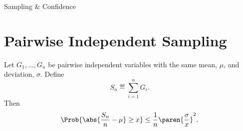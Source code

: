 \documentclass[handout]{mcs}
\begin{document}


\begin{staffnotes}
Sampling \& Confidence
\end{staffnotes}



\section*{Pairwise Independent Sampling}

\begin{theorem*}
Let $G_1, \dots, G_n$ be pairwise independent variables with the same
mean, $\mu$, and deviation, $\sigma$.  Define
\[
S_n \eqdef \sum_{i=1}^n G_i.
\]
Then
\[
\Prob{\abs{\frac{S_n}{n} - \mu} \geq x}
    \leq \frac{1}{n} \paren{\frac{\sigma}{x}}^2.
\]
\end{theorem*}
\end{document}
